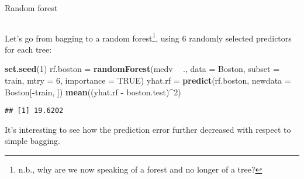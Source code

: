 \documentclass[10pt,ignorenonframetext,]{beamer}
\newenvironment{Shaded}{\begin{snugshade}}{\end{snugshade}}
\newcommand{\DataTypeTok}[1]{\textcolor[rgb]{0.13,0.29,0.53}{#1}}
\newcommand{\DecValTok}[1]{\textcolor[rgb]{0.00,0.00,0.81}{#1}}
\newcommand{\KeywordTok}[1]{\textcolor[rgb]{0.13,0.29,0.53}{\textbf{#1}}}
\newcommand{\NormalTok}[1]{#1}
\newcommand{\OperatorTok}[1]{\textcolor[rgb]{0.81,0.36,0.00}{\textbf{#1}}}
\newcommand{\OtherTok}[1]{\textcolor[rgb]{0.56,0.35,0.01}{#1}}
\newcommand{\StringTok}[1]{\textcolor[rgb]{0.31,0.60,0.02}{#1}}
\begin{document}
\begin{frame}[fragile]

\begin{block}{Random forest}

\(~\)

Let's go from bagging to a random
forest\footnote{n.b., why are we now speaking of a forest and no longer of a tree?},
using 6 randomly selected predictors for each tree:

\vspace{2mm}

\scriptsize

\begin{Shaded}
\begin{Highlighting}[]
\KeywordTok{set.seed}\NormalTok{(}\DecValTok{1}\NormalTok{)}
\NormalTok{rf.boston =}\StringTok{ }\KeywordTok{randomForest}\NormalTok{(medv }\OperatorTok{~}\StringTok{ }\NormalTok{., }\DataTypeTok{data =}\NormalTok{ Boston, }\DataTypeTok{subset =}\NormalTok{ train, }\DataTypeTok{mtry =} \DecValTok{6}\NormalTok{, }
    \DataTypeTok{importance =} \OtherTok{TRUE}\NormalTok{)}
\NormalTok{yhat.rf =}\StringTok{ }\KeywordTok{predict}\NormalTok{(rf.boston, }\DataTypeTok{newdata =}\NormalTok{ Boston[}\OperatorTok{-}\NormalTok{train, ])}
\KeywordTok{mean}\NormalTok{((yhat.rf }\OperatorTok{-}\StringTok{ }\NormalTok{boston.test)}\OperatorTok{^}\DecValTok{2}\NormalTok{)}
\end{Highlighting}
\end{Shaded}

\begin{verbatim}
## [1] 19.6202
\end{verbatim}

\vspace{2mm}
\normalsize

It's interesting to see how the prediction error further decreased with
respect to simple bagging.

\end{block}

\end{frame}
\end{document}
